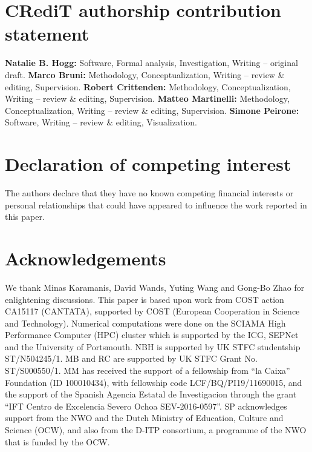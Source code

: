 \documentclass[final,3p,times,twocolumn]{elsarticle}
\begin{document}
\section*{CRediT authorship contribution statement}
\textbf{Natalie B. Hogg:} Software, Formal analysis, Investigation, Writing -- original draft. \textbf{Marco Bruni:} Methodology, Conceptualization, Writing -- review \& editing, Supervision. \textbf{Robert Crittenden:} Methodology, Conceptualization, Writing -- review \& editing, Supervision. \textbf{Matteo Martinelli:} Methodology, Conceptualization, Writing -- review \& editing, Supervision. \textbf{Simone Peirone:} Software, Writing -- review \& editing, Visualization.

\section*{Declaration of competing interest}

The authors declare that they have no known competing financial interests or personal relationships that could have appeared to influence the work reported in this paper.


\section*{Acknowledgements}
We thank Minas Karamanis, David Wands, Yuting Wang and Gong-Bo Zhao for enlightening discussions. This paper is based upon work from COST action CA15117 (CANTATA), supported by COST (European Cooperation in Science and Technology). Numerical computations were done on the SCIAMA High Performance Computer (HPC) cluster which is supported by the ICG, SEPNet and the University of Portsmouth.  NBH is supported by UK STFC studentship ST/N504245/1. MB and RC are supported by UK STFC Grant No. ST/S000550/1. MM has received the support of a fellowship from ``la Caixa'' Foundation (ID 100010434), with fellowship code LCF/BQ/PI19/11690015, and the support of the Spanish Agencia Estatal de Investigacion through the grant “IFT Centro de Excelencia Severo Ochoa SEV-2016-0597”. SP acknowledges support from the NWO and the Dutch Ministry of Education, Culture and Science (OCW), and also from the D-ITP consortium, a programme of the NWO that is funded by the OCW.




\end{document}
